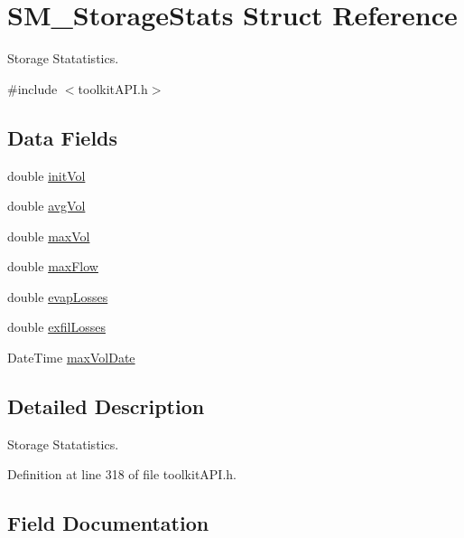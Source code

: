 \hypertarget{struct_s_m___storage_stats}{}\section{S\+M\+\_\+\+Storage\+Stats Struct Reference}
\label{struct_s_m___storage_stats}


Storage Statatistics.  




{\ttfamily \#include $<$toolkit\+A\+P\+I.\+h$>$}

\subsection*{Data Fields}
\begin{DoxyCompactItemize}
\item 
double \mbox{\hyperlink{struct_s_m___storage_stats_acdb84b3495ce673cdb2a0ce99c95484d}{init\+Vol}}
\item 
double \mbox{\hyperlink{struct_s_m___storage_stats_a9c5f7d0519c38ef53aba14d673e56008}{avg\+Vol}}
\item 
double \mbox{\hyperlink{struct_s_m___storage_stats_a4e178bd9894a08b39d615b68b788e09e}{max\+Vol}}
\item 
double \mbox{\hyperlink{struct_s_m___storage_stats_a4d84bca5454f3903c44fe865e44674f5}{max\+Flow}}
\item 
double \mbox{\hyperlink{struct_s_m___storage_stats_a26f9ddf7a3fa4cc0e243386380eec7a4}{evap\+Losses}}
\item 
double \mbox{\hyperlink{struct_s_m___storage_stats_adcd5d7e08a26246b15048680595f4581}{exfil\+Losses}}
\item 
Date\+Time \mbox{\hyperlink{struct_s_m___storage_stats_aa1b855c3609187dd317a0d75169769ab}{max\+Vol\+Date}}
\end{DoxyCompactItemize}


\subsection{Detailed Description}
Storage Statatistics. 

Definition at line 318 of file toolkit\+A\+P\+I.\+h.



\subsection{Field Documentation}
\mbox{\label{struct_s_m___storage_stats_a9c5f7d0519c38ef53aba14d673e56008}} 
